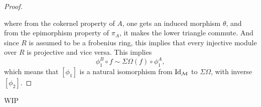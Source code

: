 \begin{proof}
\begin{center}
    \end{center}
    where from the cokernel property of \( A \), one gets an induced morphism \( \theta \), and from the epimorphism property of \( \pi_A \), it makes the lower triangle commute. And since \( R \) is assumed to be a frobenius ring, this implies that every injective module over \( R \) is projective and vice versa. This implies
    \[
        \phi_1^B \circ f \sim \Sigma\Omega(f) \circ \phi_1^A,
    \]
    which means that \( [\phi_1] \) is a natural isomorphism from \( \operatorname{Id}_{{\mathcal{M}}} \) to \( \Sigma \Omega \), with inverse \( [\phi_2] \).
\end{proof}

WIP